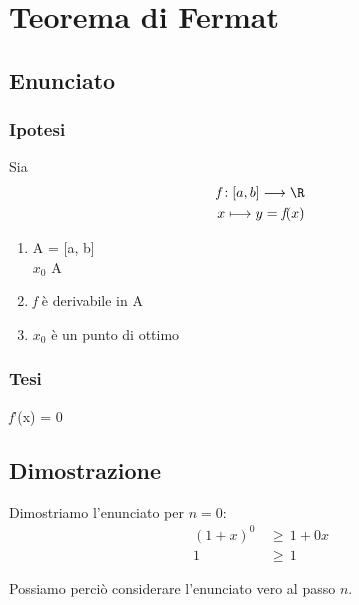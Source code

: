 \documentclass[../dimostrazioni]{subfiles}
\begin{document}
    \chapter{Teorema di Fermat}

        \section*{Enunciato}

        \subsection{Ipotesi}

        Sia \begin{align*} \textit{f} : [a, b] \longrightarrow \R\\
                                           x   \longmapsto     y = \textit{f}(x) 
            \end{align*}
        
        \begin{enumerate}
            \item A = [a, b]\\\(x_0\) \in A
            \item \textit{f} è derivabile in A
            \item \(x_0\) è un punto di ottimo
        \end{enumerate}

        \subsection{Tesi}

        \textit{f}'(x) = 0

        \section*{Dimostrazione}

            \medskip

            Dimostriamo l'enunciato per \(n = 0\):
            \begin{align*}
                (1 + x)^0 \, &\geqslant \, 1 + 0 x\\
                        1 \, &\geqslant \, 1
            \end{align*}

            Possiamo perciò considerare l'enunciato vero al passo \(n\).
\end{document}
